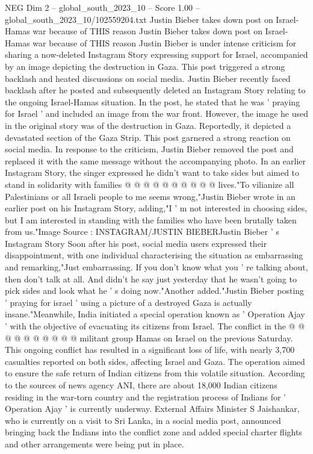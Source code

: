 \begin{textsample}{NEG Dim 2 – global\_south\_2023\_10 – Score 1.00 – global\_south\_2023\_10/102559204.txt}  \label{ex:f2_neg_274}
Justin Bieber takes down post on Israel-Hamas war because of THIS reason Justin Bieber takes down post on Israel-Hamas war because of THIS reason Justin Bieber is under intense criticism for sharing a now-deleted Instagram Story expressing support for Israel, accompanied by an image depicting the destruction in Gaza.
This post triggered a strong backlash and heated discussions on social media.
Justin Bieber recently faced backlash after he posted and subsequently deleted an Instagram Story relating to the ongoing Israel-Hamas situation.
In the post, he stated that he was ' praying for Israel ' and included an image from the war front.
However, the image he used in the original story was of the destruction in Gaza.
Reportedly, it depicted a devastated section of the Gaza Strip.
This post garnered a strong reaction on social media.
In response to the criticism, Justin Bieber removed the post and replaced it with the same message without the accompanying photo.
In an earlier Instagram Story, the singer expressed he didn't want to take sides but aimed to stand in solidarity with families @ @ @ @ @ @ @ @ @ @ lives."To vilianize all Palestinians or all Israeli people to me seems wrong,"Justin Bieber wrote in an earlier post on his Instagram Story, adding,"I ' m not interested in choosing sides, but I am interested in standing with the families who have been brutally taken from us."Image Source : INSTAGRAM/JUSTIN BIEBERJustin Bieber ' s Instagram Story Soon after his post, social media users expressed their disappointment, with one individual characterising the situation as embarrassing and remarking,"Just embarrassing.
If you don't know what you ' re talking about, then don't talk at all.
And didn't he say just yesterday that he wasn't going to pick sides and look what he ' s doing now."Another added."Justin Bieber posting ' praying for israel ' using a picture of a destroyed Gaza is actually insane."Meanwhile, India initiated a special operation known as ' Operation Ajay ' with the objective of evacuating its citizens from Israel.
The conflict in the @ @ @ @ @ @ @ @ @ @ militant group Hamas on Israel on the previous Saturday.
This ongoing conflict has resulted in a significant loss of life, with nearly 3,700 casualties reported on both sides, affecting Israel and Gaza.
The operation aimed to ensure the safe return of Indian citizens from this volatile situation.
According to the sources of news agency ANI, there are about 18,000 Indian citizens residing in the war-torn country and the registration process of Indians for ' Operation Ajay ' is currently underway.
External Affairs Minister S Jaishankar, who is currently on a visit to Sri Lanka, in a social media post, announced bringing back the Indians into the conflict zone and added special charter flights and other arrangements were being put in place.

\end{textsample}
